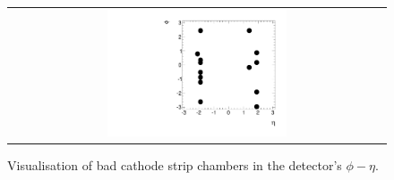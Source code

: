 \renewcommand{\arraystretch}{1.5}
\begin{table}[!b]
\centering
\caption{Intermodule ECAL gaps.}
\label{tab:IntermoduleGaps}
\end{table}  

\begin{figure}[!t]
  \centering 
  \begin{tabular}{c}
    \includegraphics[width=0.49\textwidth]{figures/analysis/AnalysisSelection/BadCSCMap.pdf}
  \end{tabular}
  \caption{Visualisation of bad cathode strip chambers in the detector's $\phi - \eta$.}
  \label{fig:BadCSCMap}
\end{figure}

